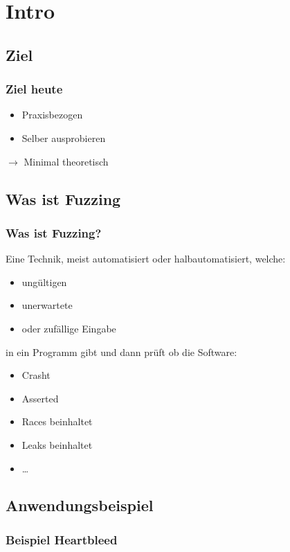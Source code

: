 \section{Intro}

\subsection{Ziel}
\begin{frame}[fragile]
	\frametitle{Ziel heute}

	\begin{itemize}
		\item Praxisbezogen
		\item Selber ausprobieren
	\end{itemize}
	$\rightarrow$ Minimal theoretisch
\end{frame}


\subsection{Was ist Fuzzing}
\begin{frame}[fragile]
	\frametitle{Was ist Fuzzing?}

	Eine Technik, meist automatisiert oder halbautomatisiert, welche:
	\pause\
	\begin{itemize}
		\item ungültigen
		\item unerwartete
		\item oder zufällige Eingabe
	\end{itemize}
	in ein Programm gibt und dann prüft ob die Software:
	\pause\
	\begin{itemize}
		\item Crasht
		\item Asserted
		\item Races beinhaltet
		\item Leaks beinhaltet
		\item \ldots
	\end{itemize}
\end{frame}

\subsection{Anwendungsbeispiel}
\begin{frame}[fragile]
	\frametitle{Beispiel Heartbleed}
	
\end{frame}

